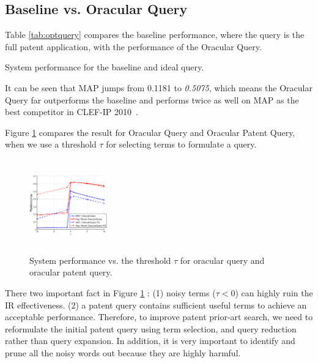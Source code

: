 \subsection{Baseline vs. Oracular Query}
Table \ref{tab:optquery} compares the baseline performance, where the query is the full patent application, with the performance of the Oracular Query. 
\begin{table}[htpb]
  \begin{center}
   \caption{System performance for the baseline and ideal query.}
     
  \label{tab:optquery}
  \end{center}  
\end{table}
It can be seen that MAP jumps from 0.1181 to {\em 0.5075}, which means the Oracular Query far outperforms the baseline and performs twice as well on MAP as the best competitor in CLEF-IP 2010~\cite{lopez2010experiments}. 

Figure \ref{fig:oracular} compares the result for Oracular Query and Oracular Patent Query, when we use a threshold $\tau$ for selecting terms to formulate a query. 
\begin{figure}[htpb]
   \centering
   \includegraphics[width=0.30\textwidth,height=40mm]{figs/oracularquery.eps}
   \caption{System performance vs. the threshold $\tau$ for oracular query and oracular patent query.}   
   \label{fig:oracular} 
\end{figure} 
There two important fact in Figure \ref{fig:oracular} : (1) noisy terms ($\tau <0 $) can highly ruin the IR effectiveness. (2) a patent query contains sufficient useful terms to achieve an acceptable performance. Therefore, to improve patent prior-art search, we need to reformulate the initial patent query using term selection, and query reduction rather than query expansion. In addition, it is very important to identify and prune all the noisy words out because they are highly harmful.  